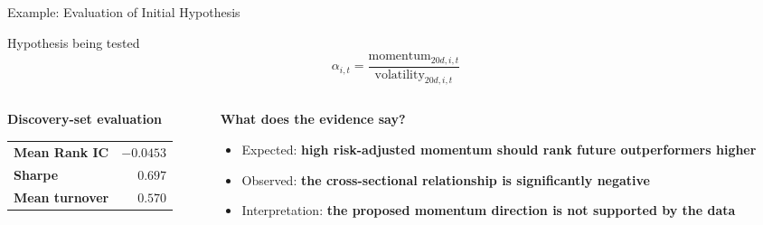 \documentclass[10pt,aspectratio=169]{beamer}
\begin{document}
\begin{frame}{Example: Evaluation of Initial Hypothesis}

\small

\begin{block}{Hypothesis being tested}
\[
\alpha_{i,t}
=
\frac{
\text{momentum}_{20d,i,t}
}{
\text{volatility}_{20d,i,t}
}
\]
\end{block}

\vspace{0.15cm}

\begin{columns}[T,onlytextwidth]

\begin{column}{0.46\textwidth}

\textbf{Discovery-set evaluation}

\vspace{0.12cm}

\begin{tabular}{lr}
\textbf{Mean Rank IC} &
\textbf{$-0.0453$} \\[4pt]

\textbf{Sharpe} &
\textbf{$0.697$} \\[4pt]

\textbf{Mean turnover} &
$0.570$ \\[4pt]
\end{tabular}

\end{column}

\begin{column}{0.50\textwidth}

\textbf{What does the evidence say?}

\vspace{0.12cm}

\begin{itemize}
    \item Expected:
    \textbf{high risk-adjusted momentum should rank future outperformers higher}

    \vspace{0.08cm}

    \item Observed:
    \textbf{the cross-sectional relationship is significantly negative}

    \vspace{0.08cm}

    \item Interpretation:
    \textbf{the proposed momentum direction is not supported by the data}
\end{itemize}

\end{column}

\end{columns}

\end{frame}
\end{document}
